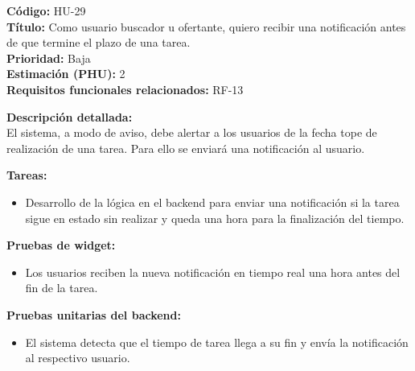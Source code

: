 \begin{tarjetaHU}
\textbf{Código:} HU-29 \\
\textbf{Título:} Como usuario buscador u ofertante, quiero recibir una notificación antes de que termine el plazo de una tarea. \\
\textbf{Prioridad:} Baja \\
\textbf{Estimación (PHU):} 2 \\
\textbf{Requisitos funcionales relacionados:} RF-13

\vspace{0.5em}
\textbf{Descripción detallada:} \\
El sistema, a modo de aviso, debe alertar a los usuarios de la fecha tope de realización de una tarea. Para ello se enviará una notificación al usuario.

\vspace{0.5em}
\textbf{Tareas:}
\begin{itemize}[left=0pt]
  \item Desarrollo de la lógica en el backend para enviar una notificación si la tarea sigue en estado sin realizar y queda una hora para la finalización del tiempo.
\end{itemize}

\vspace{0.5em}
\textbf{Pruebas de widget:}
\begin{itemize}[left=0pt]
  \item Los usuarios reciben la nueva notificación en tiempo real una hora antes del fin de la tarea.
\end{itemize}
\textbf{Pruebas unitarias del backend:}
\begin{itemize}[left=0pt]
  \item El sistema detecta que el tiempo de tarea llega a su fin y envía la notificación al respectivo usuario.
\end{itemize}
\end{tarjetaHU}

